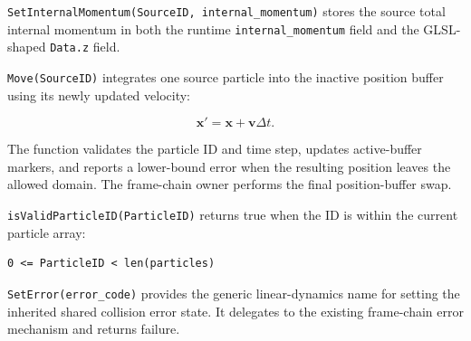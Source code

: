 
\texttt{SetInternalMomentum(SourceID, internal\_momentum)} stores the source
total internal momentum in both the runtime \texttt{internal\_momentum} field
and the GLSL-shaped \texttt{Data.z} field.


\texttt{Move(SourceID)} integrates one source particle into the inactive
position buffer using its newly updated velocity:

\begin{equation}
\mathbf{x}' = \mathbf{x}+\mathbf{v}\Delta t.
\end{equation}

The function validates the particle ID and time step, updates active-buffer
markers, and reports a lower-bound error when the resulting position leaves the
allowed domain.  The frame-chain owner performs the final position-buffer swap.


\texttt{isValidParticleID(ParticleID)} returns true when the ID is within the
current particle array:

\begin{verbatim}
0 <= ParticleID < len(particles)
\end{verbatim}


\texttt{SetError(error\_code)} provides the generic linear-dynamics name for
setting the inherited shared collision error state.  It delegates to the
existing frame-chain error mechanism and returns failure.

